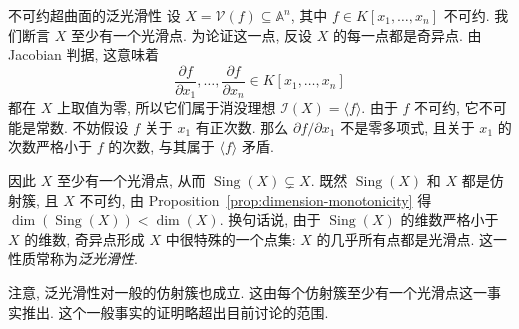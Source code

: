 \begin{Example}{不可约超曲面的泛光滑性}\leavevmode\label{ex:generic-smoothness-of-irreducible-hypersurfaces}
设 $X=\mathcal{V}(f)\subseteq\mathbb{A}^{n}$, 其中 $f\in K[x_{1},\ldots,x_{n}]$ 不可约. 我们断言 $X$ 至少有一个光滑点. 为论证这一点, 反设 $X$ 的每一点都是奇异点. 由 Jacobian 判据, 这意味着
\[
  \frac{\partial f}{\partial x_{1}},\ldots,\frac{\partial f}{\partial x_{n}}
     \in K[x_{1},\ldots,x_{n}]
\]
都在 $X$ 上取值为零, 所以它们属于消没理想 $\mathcal{I}(X)=\langle f\rangle$. 由于 $f$ 不可约, 它不可能是常数. 不妨假设 $f$ 关于 $x_{1}$ 有正次数. 那么 $\partial f/\partial x_{1}$ 不是零多项式, 且关于 $x_{1}$ 的次数严格小于 $f$ 的次数, 与其属于 $\langle f\rangle$ 矛盾.

因此 $X$ 至少有一个光滑点, 从而 $\operatorname{Sing}(X)\subsetneq X$. 既然 $\operatorname{Sing}(X)$ 和 $X$ 都是仿射簇, 且 $X$ 不可约, 由 Proposition~\ref{prop:dimension-monotonicity} 得 $\dim(\operatorname{Sing}(X))<\dim(X)$. 换句话说, 由于 $\operatorname{Sing}(X)$ 的维数严格小于 $X$ 的维数, 奇异点形成 $X$ 中很特殊的一个点集: $X$ 的几乎所有点都是光滑点. 这一性质常称为\emph{泛光滑性}.
\end{Example}

注意, 泛光滑性对一般的仿射簇也成立. 这由每个仿射簇至少有一个光滑点这一事实推出. 这个一般事实的证明略超出目前讨论的范围.

